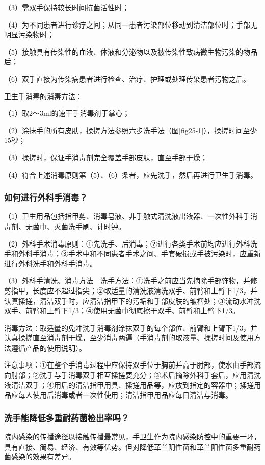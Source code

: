（3）需双手保持较长时间抗菌活性时；

（4）为不同患者进行诊疗之间；从同一患者污染部位移动到清洁部位时；手部无明显污染物时；

（5）接触具有传染性的血液、体液和分泌物以及被传染性致病微生物污染的物品后；

（6）双手直接为传染病患者进行检查、治疗、护理或处理传染患者污物之后。

卫生手消毒的消毒方法：

（1）取2～3ml的速干手消毒剂于掌心；

（2）涂抹手的所有皮肤，揉搓方法参照六步洗手法（图\ref{fig25-1}），揉搓时间至少15秒；

（3）揉搓时，保证手消毒剂完全覆盖手部皮肤，直至手部干燥；

（4）符合上述消毒原则第（5）、（6）条者，应先洗手，然后再进行卫生手消毒。

\subsubsection{如何进行外科手消毒？}

（1）卫生用品包括指甲剪、消毒皂液、非手触式清洗液出液器、一次性外科手消毒剂、无菌巾、灭菌洗手刷、计时钟。

（2）外科手术消毒原则：①先洗手、后消毒；②进行各类手术前均应进行外科洗手和外科手消毒；③手术中和不同患者手术之间、手套破损或手被污染时，应重新进行外科洗手和外科手消毒。

（3）外科手清洗、消毒方法　洗手方法：①洗手之前应当先摘除手部饰物，并修剪指甲，长度应不超过指尖；②取适量的清洗液清洗双手、前臂和上臂下1/3，并认真揉搓，清洁双手时，应清洁指甲下的污垢和手部皮肤的皱褶处；③流动水冲洗双手、前臂和上臂下1/3；④使用无菌巾彻底擦干双手、前臂和上臂下1/3。

消毒方法：取适量的免冲洗手消毒剂涂抹双手的每个部位、前臂和上臂下1/3，并认真揉搓直至消毒剂干燥，至少消毒两遍（手消毒剂的取液量、揉搓时间及使用方法遵循产品的使用说明）。

注意事项：①在整个手消毒过程中应保持双手位于胸前并高于肘部，使水由手部流向肘部；②洗手与手消毒双手相互揉搓要充分；③术后摘除外科手套后，应用清洗液清洁双手；④用后的清洁指甲用具、揉搓用品等，应放到指定的容器中；揉搓用品应每人使用后消毒或者一次性使用；清洁指甲用品应每日清洁与消毒。

\subsubsection{洗手能降低多重耐药菌检出率吗？}

院内感染的传播途径以接触传播最常见，手卫生作为院内感染防控中的重要一环，具有直接、简易、经济、有效等优势。但对降低革兰阴性菌和革兰阳性菌多重耐药菌感染的效果有差异。

